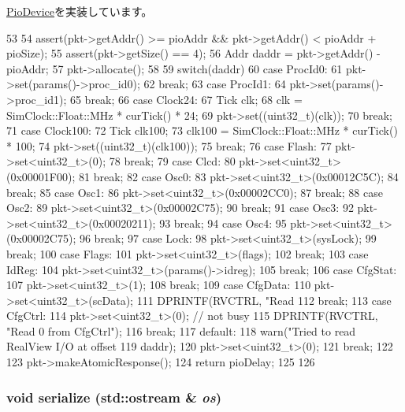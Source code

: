 \hyperlink{classPioDevice_a842312590432036092c422c87a442358}{PioDevice}を実装しています。


\begin{DoxyCode}
53 {
54     assert(pkt->getAddr() >= pioAddr && pkt->getAddr() < pioAddr + pioSize);
55     assert(pkt->getSize() == 4);
56     Addr daddr = pkt->getAddr() - pioAddr;
57     pkt->allocate();
58 
59     switch(daddr) {
60       case ProcId0:
61         pkt->set(params()->proc_id0);
62         break;
63       case ProcId1:
64         pkt->set(params()->proc_id1);
65         break;
66       case Clock24:
67         Tick clk;
68         clk = SimClock::Float::MHz * curTick() * 24;
69         pkt->set((uint32_t)(clk));
70         break;
71       case Clock100:
72         Tick clk100;
73         clk100 = SimClock::Float::MHz * curTick() * 100;
74         pkt->set((uint32_t)(clk100));
75         break;
76       case Flash:
77         pkt->set<uint32_t>(0);
78         break;
79       case Clcd:
80         pkt->set<uint32_t>(0x00001F00);
81         break;
82       case Osc0:
83         pkt->set<uint32_t>(0x00012C5C);
84         break;
85       case Osc1:
86         pkt->set<uint32_t>(0x00002CC0);
87         break;
88       case Osc2:
89         pkt->set<uint32_t>(0x00002C75);
90         break;
91       case Osc3:
92         pkt->set<uint32_t>(0x00020211);
93         break;
94       case Osc4:
95         pkt->set<uint32_t>(0x00002C75);
96         break;
97       case Lock:
98         pkt->set<uint32_t>(sysLock);
99         break;
100       case Flags:
101         pkt->set<uint32_t>(flags);
102         break;
103       case IdReg:
104         pkt->set<uint32_t>(params()->idreg);
105         break;
106       case CfgStat:
107         pkt->set<uint32_t>(1);
108         break;
109       case CfgData:
110         pkt->set<uint32_t>(scData);
111         DPRINTF(RVCTRL, "Read %
112         break;
113       case CfgCtrl:
114         pkt->set<uint32_t>(0); // not busy
115         DPRINTF(RVCTRL, "Read 0 from CfgCtrl\n");
116         break;
117       default:
118         warn("Tried to read RealView I/O at offset %
119              daddr);
120         pkt->set<uint32_t>(0);
121         break;
122     }
123     pkt->makeAtomicResponse();
124     return pioDelay;
125 
126 }
\end{DoxyCode}
\hypertarget{classRealViewCtrl_a53e036786d17361be4c7320d39c99b84}{
\subsubsection[{serialize}]{\setlength{\rightskip}{0pt plus 5cm}void serialize (std::ostream \& {\em os})}}
\label{classRealViewCtrl_a53e036786d17361be4c7320d39c99b84}


